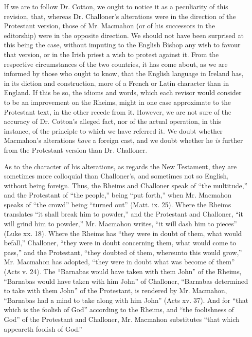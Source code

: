 If we are to follow Dr. Cotton, we ought to notice it as a
peculiarity of this revision, that, whereas Dr. Challoner's
alterations were in the direction of the Protestant version, those of
Mr. Macmahon (or of his successors in the editorship) were in the
opposite direction. We should not have been surprised at this being
the case, without imputing to the English Bishop any wish to favour
that version, or in the Irish priest a wish to protest against it.
From the respective circumstances of the two countries, it has come
about, as we are informed by those who ought to know, that the English
language in Ireland has, in its diction and construction, more of a
French or Latin character than in England. If this be so, the idioms
and words, which each revisor would consider to be an improvement on
the Rheims, might in one case approximate to the Protestant text, in
the other recede from it. However, we are not sure of the accuracy of
Dr. Cotton's alleged fact, nor of the actual operation, in this
instance, of the principle to which we have referred it. We doubt whether
Macmahon's alterations \emph{have} a foreign cast, and we doubt
whether he \emph{is} further from the Protestant version than Dr.
Challoner.

As to the character of his alterations, as regards the New
Testament, they are sometimes more colloquial than Challoner's, and
sometimes not so English, without being foreign. Thus, the Rheims and
Challoner speak of ``the multitude,'' and the Protestant
of ``the people,'' being ``put forth,'' when Mr.
Macmahon speaks of ``the crowd'' being ``turned out''
(Matt. ix. 25). Where the Rheims translates ``it shall break him
to powder,'' and the Protestant and Challoner, ``it will grind
him to powder,'' Mr. Macmahon writes, ``it will dash him to
pieces'' (Luke xx. 18). Where the Rheims has ``they were in
doubt of them, what would befall,'' Challoner, ``they were in
doubt concerning them, what would come to pass,'' and the
Protestant, ``they doubted of them, whereunto this would
grow,'' Mr. Macmahon has adopted, ``they were in doubt what
was become of them'' (Acts v. 24). The ``Barnabas would have
taken with them John'' of the Rheims, ``Barnabas would have
taken with him John'' of Challoner, ``Barnabas determined to
take with them John'' of the Protestant, is rendered by Mr.
Macmahon, ``Barnabas had a mind to take along with him John''
(Acts xv. 37). And for ``that which is the foolish of God''
according to the Rheims, and ``the foolishness of God'' of the
Protestant and Challoner, Mr. Macmahon substitutes ``that which
appeareth foolish of God.''

